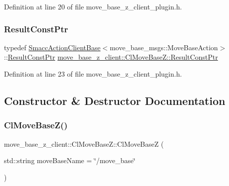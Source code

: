 Definition at line 20 of file move\+\_\+base\+\_\+z\+\_\+client\+\_\+plugin.\+h.

\mbox{\label{classmove__base__z__client_1_1ClMoveBaseZ_a3b774d99d3dd4526f99b968d65ef5834}} 
\subsubsection{\texorpdfstring{Result\+Const\+Ptr}{ResultConstPtr}}
{\footnotesize\ttfamily typedef \hyperlink{classsmacc_1_1client__bases_1_1SmaccActionClientBase_af38f27dd26f8a87fea6b3eaa4a84e604}{Smacc\+Action\+Client\+Base}$<$move\+\_\+base\+\_\+msgs\+::\+Move\+Base\+Action$>$\+::\hyperlink{classmove__base__z__client_1_1ClMoveBaseZ_a3b774d99d3dd4526f99b968d65ef5834}{Result\+Const\+Ptr} \hyperlink{classmove__base__z__client_1_1ClMoveBaseZ_a3b774d99d3dd4526f99b968d65ef5834}{move\+\_\+base\+\_\+z\+\_\+client\+::\+Cl\+Move\+Base\+Z\+::\+Result\+Const\+Ptr}}



Definition at line 23 of file move\+\_\+base\+\_\+z\+\_\+client\+\_\+plugin.\+h.



\subsection{Constructor \& Destructor Documentation}
\mbox{\label{classmove__base__z__client_1_1ClMoveBaseZ_a66d6c734cca9b92daf60933c0fc9f2ed}} 
\subsubsection{\texorpdfstring{Cl\+Move\+Base\+Z()}{ClMoveBaseZ()}}
{\footnotesize\ttfamily move\+\_\+base\+\_\+z\+\_\+client\+::\+Cl\+Move\+Base\+Z\+::\+Cl\+Move\+BaseZ (\begin{DoxyParamCaption}\item[{std\+::string}]{move\+Base\+Name = {\ttfamily \char`\"{}/move\+\_\+base\char`\"{}} }\end{DoxyParamCaption})}



